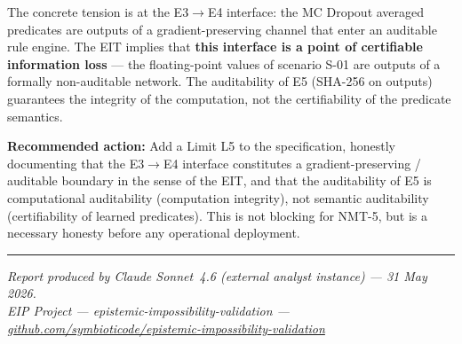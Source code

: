 \documentclass[11pt,a4paper]{article}
\theoremstyle{plain}
\begin{document}
The concrete tension is at the E3$\to$E4 interface: the MC Dropout averaged
predicates are outputs of a gradient-preserving channel that enter an auditable
rule engine. The EIT implies that \textbf{this interface is a point of certifiable
information loss} --- the floating-point values of scenario S-01 are outputs of a
formally non-auditable network. The auditability of E5 (SHA-256 on outputs)
guarantees the integrity of the computation, not the certifiability of the
predicate semantics.

\textbf{Recommended action:} Add a Limit L5 to the specification, honestly
documenting that the E3$\to$E4 interface constitutes a gradient-preserving /
auditable boundary in the sense of the EIT, and that the auditability of E5 is
computational auditability (computation integrity), not semantic auditability
(certifiability of learned predicates). This is not blocking for NMT-5, but is a
necessary honesty before any operational deployment.

\vspace{1cm}
\hrule
\vspace{0.3cm}
\small
\textit{Report produced by Claude Sonnet~4.6 (external analyst instance) --- 31 May 2026.}\\
\textit{EIP Project --- epistemic-impossibility-validation ---
\href{https://github.com/symbioticode/epistemic-impossibility-validation}%
{github.com/symbioticode/epistemic-impossibility-validation}}
\end{document}
